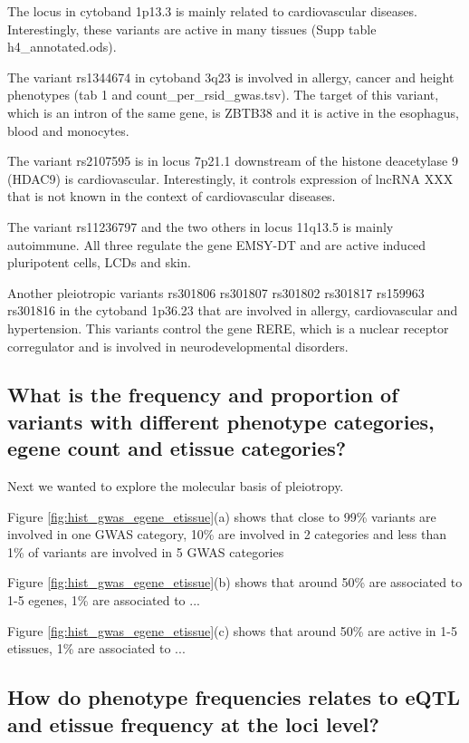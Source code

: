 The locus in cytoband 1p13.3 is mainly related to cardiovascular diseases.
Interestingly, these variants are active in many tissues (Supp table h4_annotated.ods).

The variant rs1344674 in cytoband 3q23 is involved in allergy, cancer and height phenotypes (tab 1 and count_per_rsid_gwas.tsv).
The target of this variant, which is an intron of the same gene, is ZBTB38 and it is active in the esophagus, blood and monocytes.

The variant rs2107595 is in locus 7p21.1 downstream of the histone deacetylase 9 (HDAC9) is cardiovascular. Interestingly, it controls expression of lncRNA XXX that is not known in the context of cardiovascular diseases.

The variant rs11236797 and the two others in locus 11q13.5 is mainly autoimmune.
All three regulate the gene EMSY-DT and are active induced pluripotent cells, LCDs and skin.

Another pleiotropic variants rs301806
rs301807
rs301802
rs301817
rs159963
rs301816
in the cytoband 1p36.23 that are involved in allergy, cardiovascular and hypertension.
This variants control the gene RERE, which is a nuclear receptor corregulator and is involved in neurodevelopmental disorders.\\

\subsection*{What is the frequency and proportion of variants with different phenotype categories, egene count and etissue categories?}

Next we wanted to explore the molecular basis of pleiotropy.

Figure \ref{fig:hist_gwas_egene_etissue}(a) shows that close to 99\% variants are involved in one GWAS category, 10\% are involved in 2 categories and less than 1\% of variants are involved in 5 GWAS categories

Figure \ref{fig:hist_gwas_egene_etissue}(b) shows that around 50\% are associated to 1-5 egenes, 1\% are associated to ...

Figure \ref{fig:hist_gwas_egene_etissue}(c) shows that around 50\% are active in 1-5 etissues, 1\% are associated to ...

\subsection*{How do phenotype frequencies relates to eQTL and etissue frequency at the loci level?}

